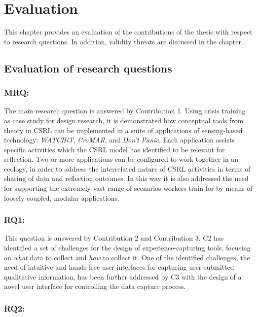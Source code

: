\chapter{Evaluation}\label{evaluation}


This chapter provides an evaluation of the contributions of the thesis with respect to research questions. In addition, validity threats are discussed in the chapter.

\section{Evaluation of research questions}\label{evaluation-of-research-questions}

\subsection{MRQ: \MRQ}\label{mrq}

The main research question is answered by Contribution 1. Using crisis training as case study for design research, it is demonstrated how conceptual tools from theory in CSRL can be implemented in a suite of applications of sensing-based technology: \emph{WATCHiT}, \emph{CroMAR}, and \emph{Don't Panic}. Each application assists specific activities which the CSRL model has identified to be relevant for reflection. Two or more applications can be configured to work together in an ecology, in order to address the interrelated nature of CSRL activities in terms of sharing of data and reflection outcomes. In this way it is also addressed the need for supporting the extremely vast range of scenarios workers train for by means of loosely coupled, modular applications.

\subsection{RQ1: \RQi}\label{rq1}

This question is answered by Contribution 2 and Contribution 3. C2 has identified a set of challenges for the design of experience-capturing tools, focusing on \emph{what} data to collect and \emph{how} to collect it. One of the identified challenges, the need of intuitive and hands-free user interfaces for capturing user-submitted qualitative information, has been further addressed by C3 with the design of a novel user interface for controlling the data capture process.

\subsection{RQ2: \RQii}\label{rq2}

